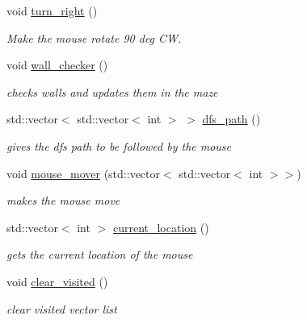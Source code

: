 \begin{DoxyCompactItemize}
\mbox{\label{classrwa2_1_1_mouse_ac929127d86fc4a41d1e216968b1dae20}} 
void \hyperlink{classrwa2_1_1_mouse_ac929127d86fc4a41d1e216968b1dae20}{turn\+\_\+right} ()
\begin{DoxyCompactList}\small\item\em Make the mouse rotate 90 deg CW. \end{DoxyCompactList}\item 
\mbox{\label{classrwa2_1_1_mouse_a0ee088e89bdbb609091679ca66f98d37}} 
void \hyperlink{classrwa2_1_1_mouse_a0ee088e89bdbb609091679ca66f98d37}{wall\+\_\+checker} ()
\begin{DoxyCompactList}\small\item\em checks walls and updates them in the maze \end{DoxyCompactList}\item 
std\+::vector$<$ std\+::vector$<$ int $>$ $>$ \hyperlink{classrwa2_1_1_mouse_ab9f225398c8ec07767559a47f2070755}{dfs\+\_\+path} ()
\begin{DoxyCompactList}\small\item\em gives the dfs path to be followed by the mouse \end{DoxyCompactList}\item 
\mbox{\label{classrwa2_1_1_mouse_a771abb2496a461ab78fa9d18fa8273ed}} 
void \hyperlink{classrwa2_1_1_mouse_a771abb2496a461ab78fa9d18fa8273ed}{mouse\+\_\+mover} (std\+::vector$<$ std\+::vector$<$ int $>$$>$)
\begin{DoxyCompactList}\small\item\em makes the mouse move \end{DoxyCompactList}\item 
std\+::vector$<$ int $>$ \hyperlink{classrwa2_1_1_mouse_a6c4e22fb4f67a100c011b634508a5c07}{current\+\_\+location} ()
\begin{DoxyCompactList}\small\item\em gets the current location of the mouse \end{DoxyCompactList}\item 
\mbox{\label{classrwa2_1_1_mouse_a3cb2cdc76a136c392e6a635adcfd2075}} 
void \hyperlink{classrwa2_1_1_mouse_a3cb2cdc76a136c392e6a635adcfd2075}{clear\+\_\+visited} ()
\begin{DoxyCompactList}\small\item\em clear visited vector list \end{DoxyCompactList}\item 
$$
\end{DoxyCompactItemize}
